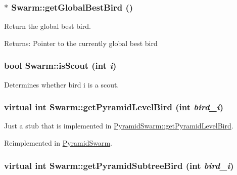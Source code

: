 \hypertarget{classSwarm_7636f17fe7017c9665678e85e20b9779}{
\subsubsection{$\ast$ Swarm::getGlobalBestBird ()}}
\label{classSwarm_7636f17fe7017c9665678e85e20b9779}


Return the global best bird. 

\begin{Desc}
\item[Returns:]Pointer to the currently global best bird \end{Desc}
\hypertarget{classSwarm_a94833190b28c495684e9681ee91b3b8}{
\subsubsection{\setlength{\rightskip}{0pt plus 5cm}bool Swarm::isScout (int {\em i})}}
\label{classSwarm_a94833190b28c495684e9681ee91b3b8}


Determines whether bird i is a scout. 

\hypertarget{classSwarm_98b6b325d8caffbc62010f80a229ad6c}{
\subsubsection{\setlength{\rightskip}{0pt plus 5cm}virtual int Swarm::getPyramidLevelBird (int {\em bird\_\-i})}}
\label{classSwarm_98b6b325d8caffbc62010f80a229ad6c}


Just a stub that is implemented in \hyperlink{classPyramidSwarm_756af67d13a153ab3d2581673733b474}{PyramidSwarm::getPyramidLevelBird}. 



Reimplemented in \hyperlink{classPyramidSwarm_756af67d13a153ab3d2581673733b474}{PyramidSwarm}.\hypertarget{classSwarm_c2cd792ce6be2f833f9a37377e1e0885}{
\subsubsection{\setlength{\rightskip}{0pt plus 5cm}virtual int Swarm::getPyramidSubtreeBird (int {\em bird\_\-i})}}
\label{classSwarm_c2cd792ce6be2f833f9a37377e1e0885}


